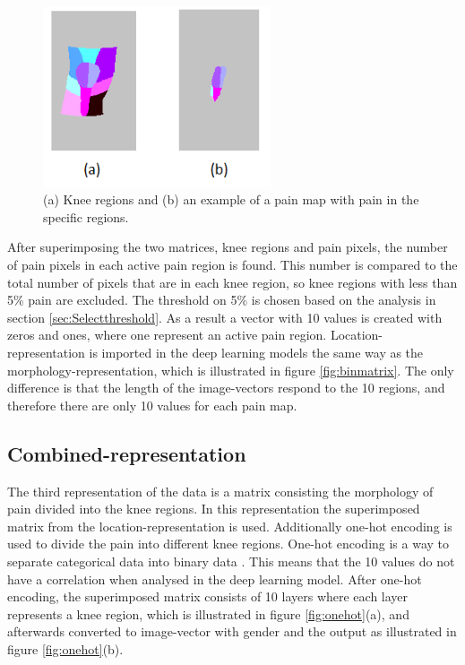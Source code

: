 \begin{figure} [H]
\centering
\includegraphics[width=0.6\textwidth]{figures/binregions}
\caption{(a) Knee regions and (b) an example of a pain map with pain in the specific regions.}
\label{fig:binregions}
\end{figure}

\noindent
After superimposing the two matrices, knee regions and pain pixels, the number of pain pixels in each active pain region is found. This number is compared to the total number of pixels that are in each knee region, so knee regions with less than 5\% pain are excluded. The threshold on 5\% is chosen based on the analysis in section \ref{sec:Selectthreshold}. As a result a vector with 10 values is created with zeros and ones, where one represent an active pain region. Location-representation is imported in the deep learning models the same way as the morphology-representation, which is illustrated in figure \ref{fig:binmatrix}. The only difference is that the length of the image-vectors respond to the 10 regions, and therefore there are only 10 values for each pain map.


\subsection{Combined-representation} \label{sec:combined}
The third representation of the data is a matrix consisting the morphology of pain divided into the knee regions.
\noindent
In this representation the superimposed matrix from the location-representation is used. Additionally one-hot encoding is used to divide the pain into different knee regions. One-hot encoding is a way to separate categorical data into binary data \citep{Harris2012}. This means that the 10 values do not have a correlation when analysed in the deep learning model. After one-hot encoding, the superimposed matrix consists of 10 layers where each layer represents a knee region, which is illustrated in figure \ref{fig:onehot}(a), and afterwards converted to image-vector with gender and the output as illustrated in figure \ref{fig:onehot}(b).

